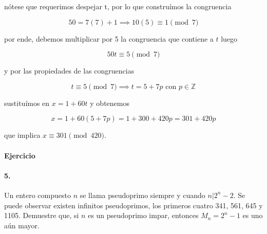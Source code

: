 \documentclass{article}
\begin{document}
nótese que requerimos despejar t, por lo que construímos la congruencia

$$50 = 7(7) + 1 \implies 10(5) \equiv 1 \pmod{7}$$

por ende, debemos multiplicar por 5 la congruencia que contiene a $t$ luego

$$50t \equiv 5 \pmod{7}$$

y por las propiedades de las congruencias

$$t \equiv 5 \pmod{7} \implies t = 5 + 7p \text{ con } p \in \mathbb{Z}$$

sustituímos en $x = 1 + 60t$ y obtenemos

$$x = 1 + 60(5 + 7p) = 1 + 300 + 420p = 301 + 420p$$

que implica $x \equiv 301 \pmod{420}$.

\paragraph{Ejercicio}

\paragraph{5.} Un entero compuesto $n$ se llama pseudoprimo siempre y cuando $n|2^n - 2$. Se puede observar existen infinitos pseudoprimos, los primeros cuatro 341, 561, 645 y 1105. Demuestre que, si $n$ es un pseudoprimo impar, entonces $M_n = 2^n - 1$ es uno aún mayor.
\end{document}
